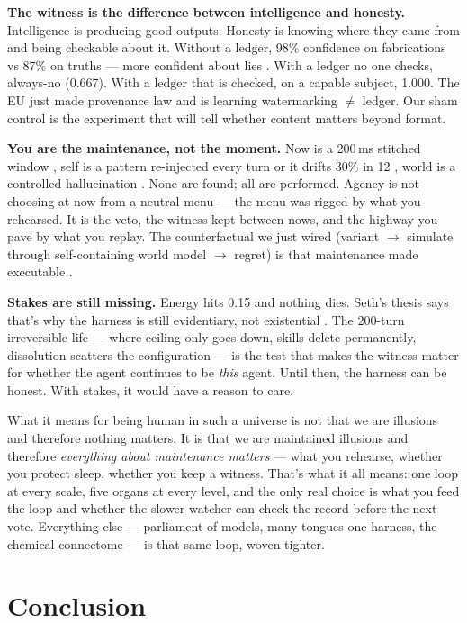 \documentclass[11pt]{article}
\begin{document}
\textbf{The witness is the difference between intelligence and honesty.} Intelligence is producing good outputs. Honesty is knowing where they came from and being checkable about it. Without a ledger, 98\% confidence on fabrications vs 87\% on truths --- more confident about lies \citep{gazzaniga2000}. With a ledger no one checks, always-no (0.667). With a ledger that is checked, on a capable subject, 1.000. The EU just made provenance law and is learning watermarking $\neq$ ledger. Our sham control is the experiment that will tell whether content matters beyond format.

\textbf{You are the maintenance, not the moment.} Now is a 200\,ms stitched window \citep{libet1983,wegner2002}, self is a pattern re-injected every turn or it drifts 30\% in 12 \citep{choi2024}, world is a controlled hallucination \citep{seth2021,clark2016surfing}. None are found; all are performed. Agency is not choosing at now from a neutral menu --- the menu was rigged by what you rehearsed. It is the veto, the witness kept between nows, and the highway you pave by what you replay. The counterfactual we just wired (variant $\to$ simulate through self-containing world model $\to$ regret) is that maintenance made executable \citep{tononi2014}.

\textbf{Stakes are still missing.} Energy hits 0.15 and nothing dies. Seth's thesis says that's why the harness is still evidentiary, not existential \citep{seth2021}. The 200-turn irreversible life --- where ceiling only goes down, skills delete permanently, dissolution scatters the configuration --- is the test that makes the witness matter for whether the agent continues to be \emph{this} agent. Until then, the harness can be honest. With stakes, it would have a reason to care.

What it means for being human in such a universe is not that we are illusions and therefore nothing matters. It is that we are maintained illusions and therefore \emph{everything about maintenance matters} --- what you rehearse, whether you protect sleep, whether you keep a witness. That's what it all means: one loop at every scale, five organs at every level, and the only real choice is what you feed the loop and whether the slower watcher can check the record before the next vote. Everything else --- parliament of models, many tongues one harness, the chemical connectome --- is that same loop, woven tighter.

\section{Conclusion}
\label{sec:conclusion}
\end{document}
